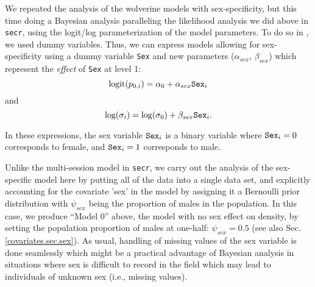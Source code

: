 {We repeated the analysis of the wolverine models with sex-specificity,
but this time doing a Bayesian analysis paralleling the likelihood
analysis we did above in \mbox{\tt secr}, using the logit/log
parameterization of the model parameters.  To do so in \bugs, we 
used dummy variables.
Thus, we can express models allowing for sex-specificity
using a dummy variable \mbox{\tt Sex} and new parameters
($\alpha_{sex}$, $\beta_{sex}$) which
represent the {\it effect} of \mbox{\tt Sex} at level 1:
\[
 \mbox{logit}(p_{0,i}) = \alpha_{0} + \alpha_{sex} \mbox{\tt Sex}_{i}
\]
and
\[
 \mbox{log}(\sigma_{i}) = \log(\sigma_{0}) + \beta_{sex} \mbox{\tt Sex}_{i}.
\]

In these expressions, the sex variable $\mbox{\tt Sex}_{i}$ is a
binary variable where $\mbox{\tt Sex}_{i}= 0$ corresponds to female,
and $\mbox{\tt Sex}_{i} = 1$ corresponds to male. 

Unlike the multi-session model in \mbox{\tt secr}, we carry out the
analysis of the sex-specific model here by putting all of the data
into a single data set, and explicitly accounting for the covariate
'sex' in the model by assigning it a Bernoulli prior distribution with
$\psi_{sex}$ being the proportion of males in the population. In this
case, we produce ``Model 0'' above, the model with no sex effect on
density, by setting the population proportion of males at one-half: $\psi_{sex} = 0.5$
(see also Sec. \ref{covariates.sec.sex}).
As usual, handling of missing values
of the sex variable is done seamlessly which might be a practical
advantage of Bayesian analysis in situations where sex is difficult to
record in the field which may lead to individuals of unknown sex
(i.e., missing values).  

}
